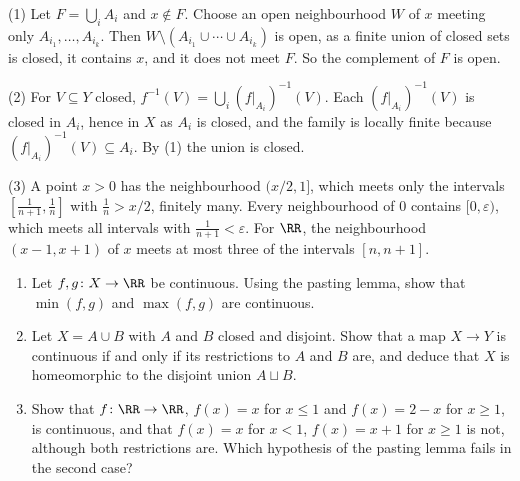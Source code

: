 \begin{solution}
(1) Let $F = \bigcup_iA_i$ and $x \notin F$. Choose an open neighbourhood $W$ of $x$ meeting only $A_{i_1}, \ldots, A_{i_k}$. Then $W \setminus (A_{i_1} \cup \cdots \cup A_{i_k})$ is open, as a finite union of closed sets is
closed, it contains $x$, and it does not meet $F$. So the complement of $F$ is open.

(2) For $V \subseteq Y$ closed, $f^{-1}(V) = \bigcup_i(f|_{A_i})^{-1}(V)$. Each $(f|_{A_i})^{-1}(V)$ is closed in $A_i$, hence in $X$ as $A_i$ is closed, and the family is locally finite because
$(f|_{A_i})^{-1}(V) \subseteq A_i$. By (1) the union is closed.

(3) A point $x > 0$ has the neighbourhood $(x/2, 1]$, which meets only the intervals $[\frac{1}{n+1}, \frac1n]$ with $\frac1n > x/2$, finitely many. Every neighbourhood of $0$ contains $[0, \varepsilon)$, which meets all intervals
with $\frac{1}{n+1} < \varepsilon$. For $\RR$, the neighbourhood $(x - 1, x + 1)$ of $x$ meets at most three of the intervals $[n, n+1]$.
\end{solution}

\begin{exercise}\label{general-topology:exercise-pasting-applications}
\begin{enumerate}
\item Let $f, g \colon X \to \RR$ be continuous. Using the pasting lemma, show that $\min(f, g)$ and $\max(f, g)$ are continuous.
\item Let $X = A \cup B$ with $A$ and $B$ closed and disjoint. Show that a map $X \to Y$ is continuous if and only if its restrictions to $A$ and $B$ are, and deduce that $X$ is homeomorphic to the disjoint
union $A \sqcup B$.
\item Show that $f \colon \RR \to \RR$, $f(x) = x$ for $x \leq 1$ and $f(x) = 2 - x$ for $x \geq 1$, is continuous, and that $f(x) = x$ for $x < 1$, $f(x) = x + 1$ for $x \geq 1$ is not, although both restrictions are.
Which hypothesis of the pasting lemma fails in the second case?
\end{enumerate}
\end{exercise}

